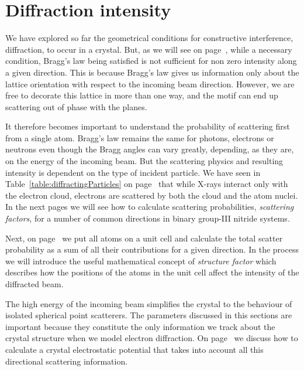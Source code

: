 \section{Diffraction intensity}
\label{sec:intensity}


We have explored so far the geometrical conditions for constructive interference, \ie diffraction, to occur in a crystal.  But, as we will see on page~\pageref{sec:strucFact}, while a necessary condition, Bragg's law being satisfied is not sufficient for non zero intensity along a given direction. This is because Bragg's law gives us information only about the lattice orientation with respect to the incoming beam direction. However, we are free to decorate this lattice in more than one way, and the motif can end up scattering out of phase with the planes.  

It therefore becomes important to understand the probability of scattering first from a single atom. Bragg's law remains the same for photons, electrons or neutrons even though the Bragg angles can vary greatly, depending, as they are, on the energy of the incoming beam. But the scattering physics and resulting intensity is dependent on the type of incident particle. We have seen in Table~\ref{table:diffractingParticles} on page~\pageref{table:diffractingParticles} that while X-rays interact only with the electron cloud, electrons are scattered by both the cloud and the atom nuclei. In the next pages we will see how to calculate scattering probabilities, \ie \textit{scattering factors},  for a number of common directions in binary group-III nitride systems. 

Next, on page~\pageref{sec:strucFact} we put all atoms on a unit cell and calculate the total scatter probability  as a sum of all their contributions for a given direction. In the process we will introduce the useful mathematical concept of \textit{structure factor} which describes how the positions of the atoms in the unit cell affect the intensity of the diffracted beam. 

 The high energy of the incoming beam simplifies the crystal to the behaviour of isolated spherical point scatterers. The parameters discussed in this sections are important because they constitute the only information we track about the crystal structure when we model electron diffraction. On page~\pageref{sec:ICpotential} we discuss how to calculate a crystal electrostatic potential that takes into account all this directional scattering information. 
 
